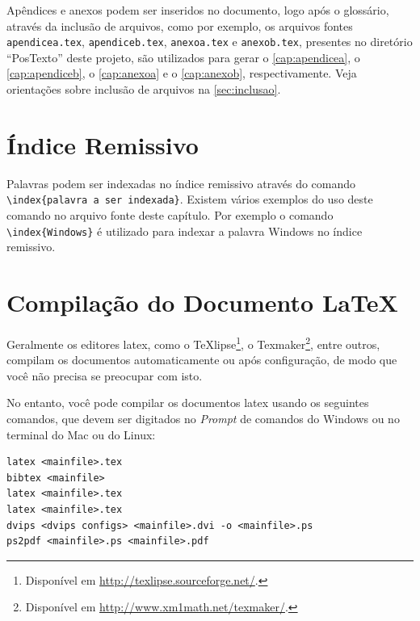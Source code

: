 Apêndices e anexos podem ser inseridos no documento, logo após o glossário, através da inclusão de arquivos, como por exemplo, os arquivos fontes \texttt{apendicea.tex}, \texttt{apendiceb.tex}, \texttt{anexoa.tex} e \texttt{anexob.tex}, presentes no diretório ``PosTexto'' deste projeto, são utilizados para gerar o \autoref{cap:apendicea}, o \autoref{cap:apendiceb}, o \autoref{cap:anexoa} e o \autoref{cap:anexob}, respectivamente. Veja orientações sobre inclusão de arquivos na \autoref{sec:inclusao}.

\section{Índice Remissivo}\label{sec:indice}

Palavras podem ser indexadas no índice remissivo através do comando \verb|\index{palavra a ser indexada}|. Existem vários exemplos do uso deste comando no arquivo fonte deste capítulo. Por exemplo o comando \verb|\index{Windows}| é utilizado para indexar a palavra Windows no índice remissivo.

\section{Compilação do Documento \LaTeX}\label{sec:compilar}

Geralmente os editores \gls{latex}, como o TeXlipse\footnote{Disponível em \url{http://texlipse.sourceforge.net/}.}, o Texmaker\footnote{Disponível em \url{http://www.xm1math.net/texmaker/}.}, entre outros, compilam os documentos automaticamente ou após configuração, de modo que você não precisa se preocupar com isto.

No entanto, você pode compilar os documentos \gls{latex} usando os seguintes comandos, que devem ser digitados no \textit{Prompt} de comandos do Windows ou no terminal do Mac ou do Linux:

\begin{SingleSpacing}%
\begin{verbatim}
latex <mainfile>.tex
bibtex <mainfile>
latex <mainfile>.tex
latex <mainfile>.tex
dvips <dvips configs> <mainfile>.dvi -o <mainfile>.ps
ps2pdf <mainfile>.ps <mainfile>.pdf
\end{verbatim}
\end{SingleSpacing}

